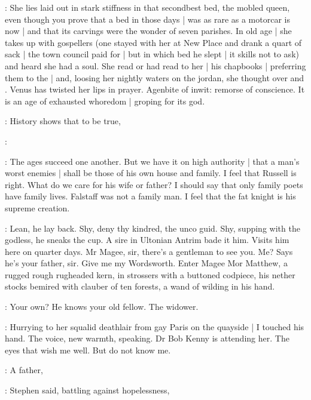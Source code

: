 \Stephen:
She lies laid out in stark stiffness in that secondbest bed,
the mobled queen,
even though you prove that a bed in those days |
was as rare as a motorcar is now |
and that its carvings were the wonder of seven parishes.
In old age |
she takes up with gospellers
(one stayed with her at New Place
and drank a quart of sack |
the town council paid for |
but in which bed he slept |
it skills not to ask)
and heard she had a soul.
She read or had read to her |
his chapbooks |
preferring them to the  |
and, loosing her nightly waters on the jordan,
she thought over 
and .
Venus has twisted her lips in prayer.
Agenbite of inwit:
remorse of conscience.
It is an age of exhausted whoredom |
groping for its god.

\eglinton:
History shows that to be true,

:

\eglinton:
The ages succeed one another.
But we have it on high authority |
that a man's worst enemies |
shall be those of his own house and family.
I feel that Russell is right.
What do we care for his wife or father?
I should say that only family poets have family lives.
Falstaff was not a family man.
I feel that the fat knight is his supreme creation.

\StephenInt:
Lean, he lay back.
Shy, deny thy kindred,
the unco guid.
Shy, supping with the godless,
he sneaks the cup.
A sire in Ultonian Antrim bade it him.
Visits him here on quarter days.
Mr Magee, sir,
there's a gentleman to see you.
Me?
Says he's your father, sir.
Give me my Wordsworth.
Enter Magee Mor Matthew,
a rugged rough rugheaded kern,
in strossers with a buttoned codpiece,
his nether stocks bemired with clauber of ten forests,
a wand of wilding in his hand.

\StephenInt:
Your own?
He knows your old fellow.
The widower.

\StephenInt:
Hurrying to her squalid deathlair from gay Paris on the quayside |
I touched his hand.
The voice, new warmth, speaking.
Dr Bob Kenny is attending her.
The eyes that wish me well.
But do not know me.

\Stephen:
A father,

:
Stephen said, battling against hopelessness,

